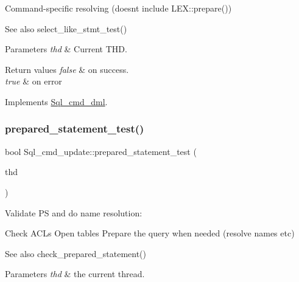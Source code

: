 Command-\/specific resolving (doesn\textquotesingle{}t include L\+E\+X\+::prepare())

\begin{DoxySeeAlso}{See also}
select\+\_\+like\+\_\+stmt\+\_\+test()
\end{DoxySeeAlso}

\begin{DoxyParams}{Parameters}
{\em thd} & Current T\+HD.\\
\hline
\end{DoxyParams}

\begin{DoxyRetVals}{Return values}
{\em false} & on success. \\
\hline
{\em true} & on error \\
\hline
\end{DoxyRetVals}


Implements \mbox{\hyperlink{classSql__cmd__dml_ad395374af7ac799573ca41d87b60b977}{Sql\+\_\+cmd\+\_\+dml}}.

\mbox{\label{classSql__cmd__update_ae0fcfae54301cb796e4bc9adfc2c8ec5}} 
\subsubsection{\texorpdfstring{prepared\+\_\+statement\+\_\+test()}{prepared\_statement\_test()}}
{\footnotesize\ttfamily bool Sql\+\_\+cmd\+\_\+update\+::prepared\+\_\+statement\+\_\+test (\begin{DoxyParamCaption}\item[{T\+HD $\ast$}]{thd }\end{DoxyParamCaption})\hspace{0.3cm}{\ttfamily [virtual]}}

Validate PS and do name resolution\+:

Check A\+C\+Ls Open tables Prepare the query when needed (resolve names etc)

\begin{DoxySeeAlso}{See also}
check\+\_\+prepared\+\_\+statement()
\end{DoxySeeAlso}

\begin{DoxyParams}{Parameters}
{\em thd} & the current thread.\\
\hline
\end{DoxyParams}

